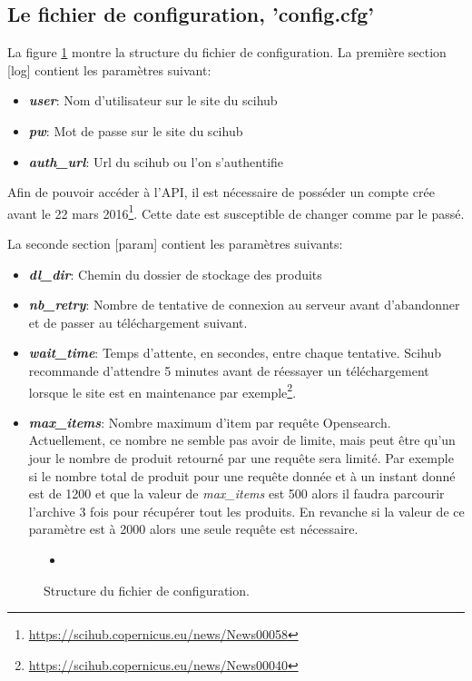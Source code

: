 \documentclass[notitlepage]{report}
\newcommand{\insertcode}[2]{\begin{itemize}\item[]\end{itemize}} %
\begin{document}
\subsection{Le fichier de configuration, 'config.cfg'}
La figure \ref{fig:conf} montre la structure du fichier de configuration. La première section [log] contient les paramètres suivant:
\begin{itemize}
\item \textbf{\emph{user}}: Nom d'utilisateur sur le site du scihub
\item \textbf{\emph{pw}}: Mot de passe sur le site du scihub
\item \textbf{\emph{auth\_url}}: Url du scihub ou l'on s'authentifie
\end{itemize}
Afin de pouvoir accéder à l'API, il est nécessaire de posséder un compte crée avant le 22 mars 2016\footnote{\url{https://scihub.copernicus.eu/news/News00058}}. Cette date est susceptible de changer comme par le passé.

La seconde section [param] contient les paramètres suivants:
\begin{itemize}
\item \textbf{\emph{dl\_dir}}: Chemin du dossier de stockage des produits
\item \textbf{\emph{nb\_retry}}: Nombre de tentative de connexion au serveur avant d'abandonner et de passer au téléchargement suivant.
\item \textbf{\emph{wait\_time}}: Temps d'attente, en secondes, entre chaque tentative. Scihub recommande d'attendre 5 minutes avant de réessayer un téléchargement lorsque le site est en maintenance par exemple\footnote{\url{https://scihub.copernicus.eu/news/News00040}}.
\item \textbf{\emph{max\_items}}: Nombre maximum d'item par requête Opensearch. Actuellement, ce nombre ne semble pas avoir de limite, mais peut être qu'un jour le nombre de produit retourné par une requête sera limité. Par exemple si le nombre total de produit pour une requête donnée et à un instant donné est de 1200 et que la valeur de \emph{max\_items} est 500 alors il faudra parcourir l'archive 3 fois pour récupérer tout les produits. En revanche si la valeur de ce paramètre est à 2000 alors une seule requête est nécessaire.
\end{itemize}


\begin{figure}
\insertcode{"exemple/exempleConfig.cfg"}{}
\caption{Structure du fichier de configuration.}
\label{fig:conf}
\end{figure}
\end{document}
